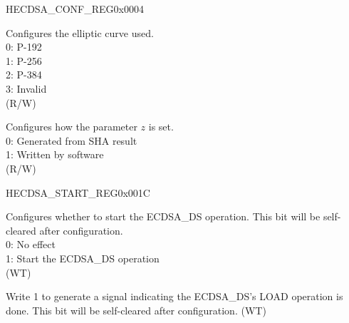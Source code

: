 \begin{register}{H}{ECDSA\_CONF\_REG}{0x0004}\label{regdesc:ECDSACONFREG}
%
%
%
%
%
\regnewline%
\begin{regdesc}\begin{reglist}
\label{fielddesc:ECDSAECCCURVE}\item [ECDSA\_ECC\_CURVE] Configures the elliptic curve used.\\
0: P-192\\
1: P-256\\
2: P-384\\
3: Invalid\\
(R/W)
\label{fielddesc:ECDSASOFTWARESETZ}\item [ECDSA\_SOFTWARE\_SET\_Z] Configures how the parameter $z$ is set. \\
0: Generated from SHA result\\
1: Written by software\\
(R/W)
\end{reglist}\end{regdesc}
\end{register}


\begin{register}{H}{ECDSA\_START\_REG}{0x001C}\label{regdesc:ECDSASTARTREG}
%
%
%
\regnewline%
\begin{regdesc}\begin{reglist}
\label{fielddesc:ECDSASTART}\item [ECDSA\_START] Configures whether to start the ECDSA\_DS operation. This bit will be self-cleared after configuration. \\
0: No effect\\
1: Start the ECDSA\_DS operation\\
(WT)
\label{fielddesc:ECDSALOADDONE}\item [ECDSA\_LOAD\_DONE] Write 1 to generate a signal indicating the ECDSA\_DS's LOAD operation is done. This bit will be self-cleared after configuration. (WT)
\end{reglist}\end{regdesc}
\end{register}


